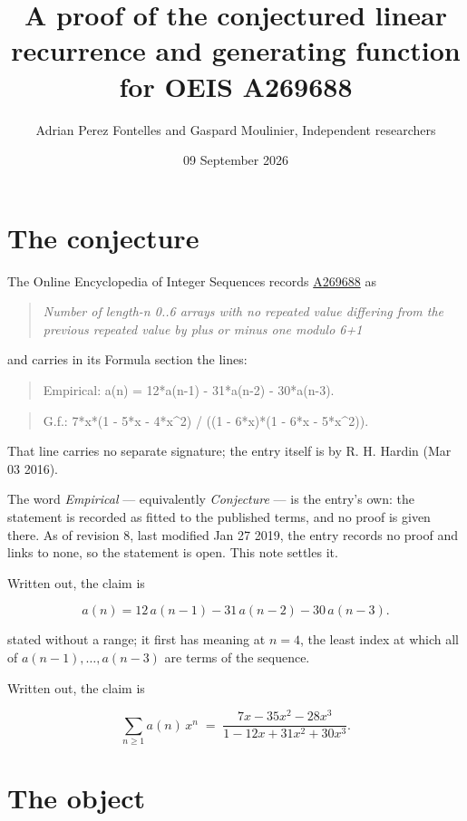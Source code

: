 \documentclass[11pt]{article}
\title{A proof of the conjectured linear recurrence and generating function for OEIS A269688}
\author{Adrian Perez Fontelles and Gaspard Moulinier, Independent researchers}
\date{09 September 2026}
\theoremstyle{definition}
\begin{document}
\maketitle
\section{The conjecture}

The Online Encyclopedia of Integer Sequences records \href{https://oeis.org/A269688}{A269688} as

\begin{quote}\itshape Number of length-n 0..6 arrays with no repeated value differing from the previous repeated value by plus or minus one modulo 6+1\end{quote}

and carries in its Formula section the lines:

\begin{quote}\ttfamily Empirical: a(n) = 12*a(n-1) - 31*a(n-2) - 30*a(n-3).\end{quote}

\begin{quote}\ttfamily G.f.: 7*x*(1 - 5*x - 4*x\textasciicircum{}2) / ((1 - 6*x)*(1 - 6*x - 5*x\textasciicircum{}2)).\end{quote}

That line carries no separate signature; the entry itself is by R. H. Hardin (Mar 03 2016).

The word {\itshape Empirical} --- equivalently {\itshape Conjecture} --- is the entry's own: the statement is recorded as fitted to the published terms, and no proof is given there. As of revision 8, last modified Jan 27 2019, the entry records no proof and links to none, so the statement is open. This note settles it.

Written out, the claim is

\[a(n) = 12\,a(n-1) - 31\,a(n-2) - 30\,a(n-3).\]

stated without a range; it first has meaning at $n = 4$, the least index at which all of $a(n-1),\dots,a(n-3)$ are terms of the sequence.

Written out, the claim is

\[\sum_{n \ge 1} a(n)\,x^n \;=\; \frac{7x - 35x^{2} - 28x^{3}}{1 - 12x + 31x^{2} + 30x^{3}}.\]

\section{The object}
\end{document}
